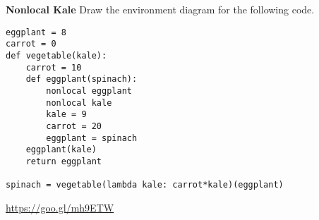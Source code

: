 \begin{blocksection}
\question \textbf{Nonlocal Kale} \newline
Draw the environment diagram for the following code.

\begin{lstlisting}
eggplant = 8
carrot = 0
def vegetable(kale):
    carrot = 10
    def eggplant(spinach):
        nonlocal eggplant
        nonlocal kale
        kale = 9
        carrot = 20
        eggplant = spinach
    eggplant(kale)
    return eggplant

spinach = vegetable(lambda kale: carrot*kale)(eggplant)
\end{lstlisting}

\begin{solution}[1.5in]
\url{https://goo.gl/mh9ETW}
\end{solution}
\end{blocksection}

